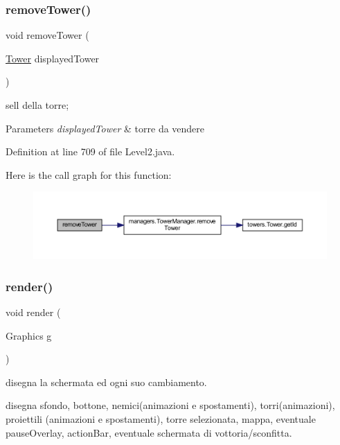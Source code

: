 \subsubsection{\texorpdfstring{remove\+Tower()}{removeTower()}}
{\footnotesize\ttfamily void remove\+Tower (\begin{DoxyParamCaption}\item[{\hyperlink{classtowers_1_1_tower}{Tower}}]{displayed\+Tower }\end{DoxyParamCaption})}



sell della torre; 


\begin{DoxyParams}{Parameters}
{\em displayed\+Tower} & torre da vendere \\
\hline
\end{DoxyParams}


Definition at line 709 of file Level2.\+java.

Here is the call graph for this function\+:
\nopagebreak
\begin{figure}[H]
\begin{center}
\leavevmode
\includegraphics[width=350pt]{classscenes_1_1_level2_addba85b44e35a186e066b2e801f433c4_cgraph}
\end{center}
\end{figure}
\mbox{\label{classscenes_1_1_level2_a203b6ad9d5e4d54dd1152986eec4dedc}} 
\subsubsection{\texorpdfstring{render()}{render()}}
{\footnotesize\ttfamily void render (\begin{DoxyParamCaption}\item[{Graphics}]{g }\end{DoxyParamCaption})}



disegna la schermata ed ogni suo cambiamento. 

disegna sfondo, bottone, nemici(animazioni e spostamenti), torri(animazioni), proiettili (animazioni e spostamenti), torre selezionata, mappa, eventuale pause\+Overlay, action\+Bar, eventuale schermata di vottoria/sconfitta.


